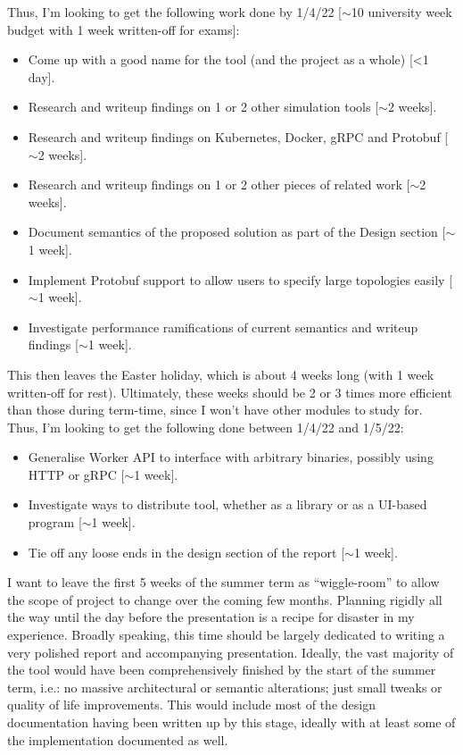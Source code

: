 Thus, I'm looking to get the following work done by 1/4/22 [$\sim$10 university week budget with 1 week written-off for
exams]:
\begin{itemize}
    \item Come up with a good name for the tool (and the project as a whole) [<1 day].
    \item Research and writeup findings on 1 or 2 other simulation tools [$\sim$2 weeks].
    \item Research and writeup findings on Kubernetes, Docker, gRPC and Protobuf [$\sim$2 weeks].
    \item Research and writeup findings on 1 or 2 other pieces of related work [$\sim$2 weeks].
    \item Document semantics of the proposed solution as part of the Design section [$\sim$1 week].
    \item Implement Protobuf support to allow users to specify large topologies easily [$\sim$1 week].
    \item Investigate performance ramifications of current semantics and writeup findings [$\sim$1 week].
\end{itemize}

This then leaves the Easter holiday, which is about 4 weeks long (with 1 week written-off for rest). Ultimately,
these weeks should be 2 or 3 times more efficient than those during term-time, since I won't have other modules to
study for. Thus, I'm looking to get the following done between 1/4/22 and 1/5/22:
\begin{itemize}
    \item Generalise Worker API to interface with arbitrary binaries, possibly using HTTP or gRPC [$\sim$1 week].
    \item Investigate ways to distribute tool, whether as a library or as a UI-based program [$\sim$1 week].
    \item Tie off any loose ends in the design section of the report [$\sim$1 week].
\end{itemize}

I want to leave the first 5 weeks of the summer term as ``wiggle-room'' to allow the scope of project to change over
the coming few months. Planning rigidly all the way until the day before the presentation is a recipe for disaster in my
experience. Broadly speaking, this time should be largely dedicated to writing a very polished report and accompanying
presentation. Ideally, the vast majority of the tool would have been comprehensively finished by the start of the summer
term, i.e.: no massive architectural or semantic alterations; just small tweaks or quality of life improvements. This
would include most of the design documentation having been written up by this stage, ideally with at least some of
the implementation documented as well.


